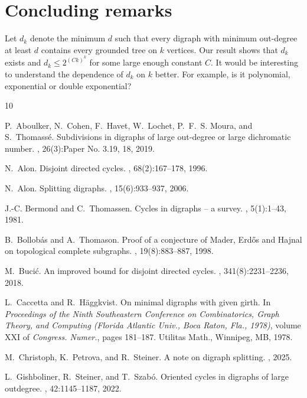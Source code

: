 \documentclass[a4paper,11pt]{article}
\theoremstyle{definition}
\begin{document}
\section{Concluding remarks}
Let $d_k$ denote the minimum $d$ such that every digraph with minimum out-degree at least $d$ contains every grounded tree on $k$ vertices. Our result shows that $d_k$ exists and $d_k\leq 2^{(Ck)^{k}}$ for some large enough constant $C$. It would be interesting to understand the dependence of $d_k$ on $k$ better. For example, is it polynomial, exponential or double exponential? 

\begin{thebibliography}{10}

P.~Aboulker, N.~Cohen, F.~Havet, W.~Lochet, P.~F.~S. Moura, and S.~Thomass\'e.
\newblock Subdivisions in digraphs of large out-degree or large dichromatic number.
, 26(3):Paper No. 3.19, 18, 2019.

N.~Alon.
\newblock Disjoint directed cycles.
, 68(2):167--178, 1996.

N.~Alon.
\newblock Splitting digraphs.
, 15(6):933--937, 2006.

J.-C. Bermond and C.~Thomassen.
\newblock Cycles in digraphs -- a survey.
, 5(1):1--43, 1981.

B.~Bollob\'as and A.~Thomason.
\newblock Proof of a conjecture of {M}ader, {E}rd{\H o}s and {H}ajnal on topological complete subgraphs.
, 19(8):883--887, 1998.

M.~Buci\'c.
\newblock An improved bound for disjoint directed cycles.
, 341(8):2231--2236, 2018.

L.~Caccetta and R.~H\"aggkvist.
\newblock On minimal digraphs with given girth.
\newblock In {\em Proceedings of the {N}inth {S}outheastern {C}onference on {C}ombinatorics, {G}raph {T}heory, and {C}omputing ({F}lorida {A}tlantic {U}niv., {B}oca {R}aton, {F}la., 1978)}, volume XXI of {\em Congress. Numer.}, pages 181--187. Utilitas Math., Winnipeg, MB, 1978.

M.~Christoph, K.~Petrova, and R.~Steiner.
\newblock A note on digraph splitting.
, 2025.

L.~Gishboliner, R.~Steiner, and T.~Szab\'o.
\newblock Oriented cycles in digraphs of large outdegree.
, 42:1145--1187, 2022.


\end{thebibliography}
\end{document}
